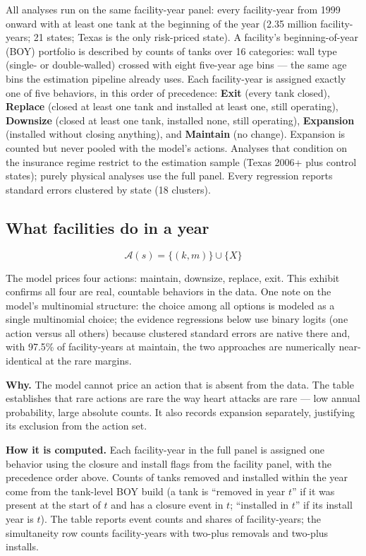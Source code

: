 \documentclass[
  letterpaper,
  DIV=11,
  numbers=noendperiod]{scrartcl}
\begin{document}
All analyses run on the same facility-year panel: every facility-year
from 1999 onward with at least one tank at the beginning of the year
(2.35 million facility-years; 21 states; Texas is the only risk-priced
state). A facility's beginning-of-year (BOY) portfolio is described by
counts of tanks over 16 categories: wall type (single- or double-walled)
crossed with eight five-year age bins --- the same age bins the
estimation pipeline already uses. Each facility-year is assigned exactly
one of five behaviors, in this order of precedence: \textbf{Exit} (every
tank closed), \textbf{Replace} (closed at least one tank and installed
at least one, still operating), \textbf{Downsize} (closed at least one
tank, installed none, still operating), \textbf{Expansion} (installed
without closing anything), and \textbf{Maintain} (no change). Expansion
is counted but never pooled with the model's actions. Analyses that
condition on the insurance regime restrict to the estimation sample
(Texas 2006+ plus control states); purely physical analyses use the full
panel. Every regression reports standard errors clustered by state (18
clusters).

\subsection{What facilities do in a year}\label{sec-ae-x1}

\[
\mathcal{A}(s) = \{(k,m)\} \cup \{X\}
\]

The model prices four actions: maintain, downsize, replace, exit. This
exhibit confirms all four are real, countable behaviors in the data. One
note on the model's multinomial structure: the choice among all options
is modeled as a single multinomial choice; the evidence regressions
below use binary logits (one action versus all others) because clustered
standard errors are native there and, with 97.5\% of facility-years at
maintain, the two approaches are numerically near-identical at the rare
margins.

\textbf{Why.} The model cannot price an action that is absent from the
data. The table establishes that rare actions are rare the way heart
attacks are rare --- low annual probability, large absolute counts. It
also records expansion separately, justifying its exclusion from the
action set.

\textbf{How it is computed.} Each facility-year in the full panel is
assigned one behavior using the closure and install flags from the
facility panel, with the precedence order above. Counts of tanks removed
and installed within the year come from the tank-level BOY build (a tank
is ``removed in year \(t\)'' if it was present at the start of \(t\) and
has a closure event in \(t\); ``installed in \(t\)'' if its install year
is \(t\)). The table reports event counts and shares of facility-years;
the simultaneity row counts facility-years with two-plus removals and
two-plus installs.
\end{document}
